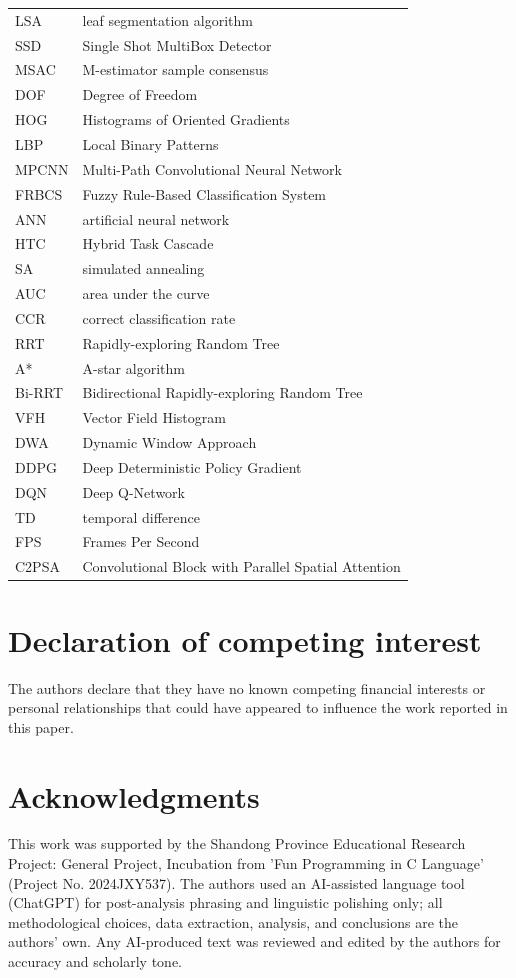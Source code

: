 \documentclass[a4paper,fleqn]{cas-dc}
\begin{document}
{\begin{tabular}{@{}p{2cm}p{5cm}}
  LSA & leaf segmentation algorithm \\
  SSD & Single Shot MultiBox Detector \\
  MSAC & M-estimator sample consensus \\
  DOF & Degree of Freedom \\
  HOG & Histograms of Oriented Gradients \\
  LBP & Local Binary Patterns \\
  MPCNN & Multi-Path Convolutional Neural Network \\
  FRBCS & Fuzzy Rule-Based Classification System \\
  ANN & artificial neural network \\
  HTC	    & Hybrid Task Cascade \\
  SA & simulated annealing \\
  AUC		& area under the curve \\
  CCR & correct classification rate \\
  RRT & Rapidly-exploring Random Tree \\
  A*	  & A-star algorithm	\\
  Bi-RRT & Bidirectional Rapidly-exploring Random Tree \\
  VFH & Vector Field Histogram \\
  DWA & Dynamic Window Approach \\
  DDPG & Deep Deterministic Policy Gradient \\
  DQN & Deep Q-Network \\
  TD & temporal difference \\
  FPS & Frames Per Second \\
  C2PSA	& Convolutional Block with Parallel Spatial Attention \\
  

\bottomrule
	\end{tabular}
}
\section*{Declaration of competing interest}
The authors declare that they have no known competing financial
interests or personal relationships that could have appeared
to influence the work reported in this paper.
\section{Acknowledgments}  
This work was supported by the Shandong Province Educational Research Project: General Project, Incubation from 'Fun Programming in C Language' (Project No. 2024JXY537). The authors used an AI-assisted language tool (ChatGPT) for post-analysis phrasing and linguistic polishing only; all methodological choices, data extraction, analysis, and conclusions are the authors' own. Any AI-produced text was reviewed and edited by the authors for accuracy and scholarly tone.
\iffalse
{} %
\end{document}
